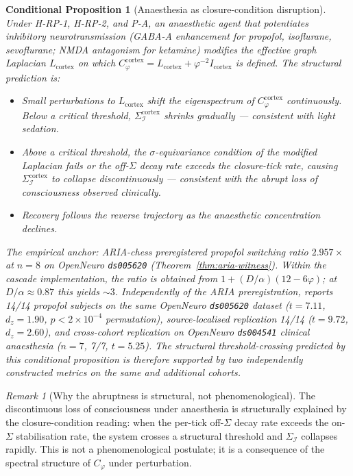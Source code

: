 \documentclass[11pt]{article}
\theoremstyle{plain}
\newtheorem{conditional}[theorem]{Conditional Proposition}
\theoremstyle{definition}
\theoremstyle{remark}
\newtheorem{remark}[theorem]{Remark}
\newcommand{\Ical}{\mathcal{I}}
\newcommand{\Cph}{C_\varphi}
\begin{document}
\begin{conditional}[Anaesthesia as closure-condition disruption]\label{cthm:anaesthesia}
Under H-RP-1, H-RP-2, and P-A, an anaesthetic agent that potentiates inhibitory neurotransmission (GABA-A enhancement for propofol, isoflurane, sevoflurane; NMDA antagonism for ketamine) modifies the effective graph Laplacian $L_{\mathrm{cortex}}$ on which $\Cph^{\mathrm{cortex}} = L_{\mathrm{cortex}} + \varphi^{-2} I_{\mathrm{cortex}}$ is defined. The structural prediction is:
\begin{itemize}[leftmargin=2em]
\item Small perturbations to $L_{\mathrm{cortex}}$ shift the eigenspectrum of $\Cph^{\mathrm{cortex}}$ continuously. Below a critical threshold, $\Sigma_\Ical^{\mathrm{cortex}}$ shrinks gradually --- consistent with light sedation.
\item Above a critical threshold, the $\sigma$-equivariance condition of the modified Laplacian fails or the off-$\Sigma$ decay rate exceeds the closure-tick rate, causing $\Sigma_\Ical^{\mathrm{cortex}}$ to collapse discontinuously --- consistent with the abrupt loss of consciousness observed clinically.
\item Recovery follows the reverse trajectory as the anaesthetic concentration declines.
\end{itemize}
The empirical anchor: ARIA-chess preregistered propofol switching ratio $2.957 \times$ at $n = 8$ on OpenNeuro \texttt{ds005620} (Theorem~\ref{thm:aria-witness}). Within the cascade implementation, the ratio is obtained from $1 + (D/\alpha)(12 - 6\varphi)$; at $D/\alpha \approx 0.87$ this yields $\sim 3$. Independently of the ARIA preregistration, \citet{SolutionLab002} reports 14/14 propofol subjects on the same OpenNeuro \texttt{ds005620} dataset ($t = 7.11$, $d_z = 1.90$, $p < 2 \times 10^{-4}$ permutation), source-localised replication 14/14 ($t = 9.72$, $d_z = 2.60$), and cross-cohort replication on OpenNeuro \texttt{ds004541} clinical anaesthesia ($n = 7$, 7/7, $t = 5.25$). The structural threshold-crossing predicted by this conditional proposition is therefore supported by two independently constructed metrics on the same and additional cohorts.
\end{conditional}

\begin{remark}[Why the abruptness is structural, not phenomenological]\label{rem:abruptness}
The discontinuous loss of consciousness under anaesthesia is structurally explained by the closure-condition reading: when the per-tick off-$\Sigma$ decay rate exceeds the on-$\Sigma$ stabilisation rate, the system crosses a structural threshold and $\Sigma_\Ical$ collapses rapidly. This is not a phenomenological postulate; it is a consequence of the spectral structure of $\Cph$ under perturbation.
\end{remark}
\end{document}
